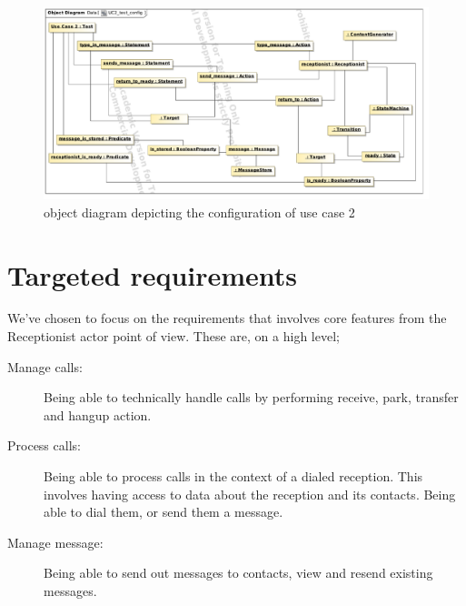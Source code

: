 \begin{figure}
  \centering
 
  \includegraphics[scale=0.65]{img/uc2_test_config}
  \caption{object diagram depicting the configuration of use case 2}
  \label{fig:uc2_object_diagram}
\end{figure}

\section{Targeted requirements}
We've chosen to focus on the requirements that involves core features from the Receptionist actor point of view. These are, on a high level;
\begin{description}
  \item[Manage calls:] Being able to technically handle calls by performing receive, park, transfer and hangup action.
  \item[Process calls:] Being able to process calls in the context of a dialed reception. This involves having access to data about the reception and its contacts. Being able to dial them, or send them a message.
  \item[Manage message:] Being able to send out messages to contacts, view and resend existing messages.
\end{description}


